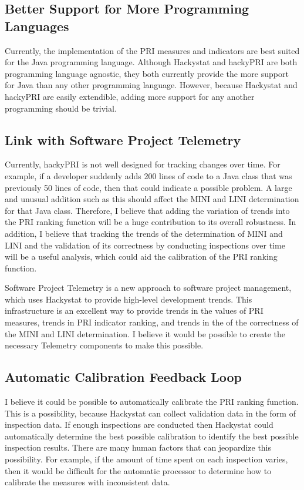 \subsection{Better Support for More Programming Languages}
Currently, the implementation of the PRI measures and indicators are best
suited for the Java programming language. Although Hackystat and hackyPRI
are both programming language agnostic, they both currently provide the
more support for Java than any other programming language. However, because
Hackystat and hackyPRI are easily extendible, adding more support for any
another programming should be trivial.


\subsection{Link with Software Project Telemetry}
Currently, hackyPRI is not well designed for tracking changes over time.
For example, if a developer suddenly adds 200 lines of code to a Java class
that was previously 50 lines of code, then that could indicate a possible
problem. A large and unusual addition such as this should affect the MINI
and LINI determination for that Java class. Therefore, I believe that
adding the variation of trends into the PRI ranking function will be a huge
contribution to its overall robustness.  In addition, I believe that
tracking the trends of the determination of MINI and LINI and the
validation of its correctness by conducting inspections over time will be a
useful analysis, which could aid the calibration of the PRI ranking
function.

Software Project Telemetry \cite{csdl2-04-11} is a new approach to software
project management, which uses Hackystat to provide high-level development
trends. This infrastructure is an excellent way to provide trends in the
values of PRI measures, trends in PRI indicator ranking, and trends in the
of the correctness of the MINI and LINI determination. I believe it would
be possible to create the necessary Telemetry components to make this
possible.


\subsection{Automatic Calibration Feedback Loop}
I believe it could be possible to automatically calibrate the PRI ranking
function. This is a possibility, because Hackystat can collect validation
data in the form of inspection data. If enough inspections are conducted
then Hackystat could automatically determine the best possible calibration
to identify the best possible inspection results. There are many human
factors that can jeopardize this possibility. For example, if the amount of
time spent on each inspection varies, then it would be difficult for the
automatic processor to determine how to calibrate the measures with
inconsistent data.


